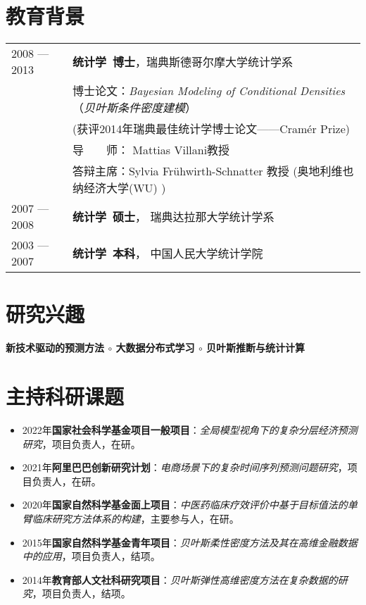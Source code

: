 \documentclass[twoside,a4paper,11pt]{article}
\begin{document}
\section*{教育背景}

\begin{tabular}{ l  p{}}
  2008 --- 2013 & \textbf{统计学~博士}，瑞典斯德哥尔摩大学统计学系 \\
                & 博士论文：\emph{Bayesian Modeling of Conditional Densities}（\emph{贝叶斯条件密度建模}） \\
                & (获评2014年瑞典最佳统计学博士论文——Cramér Prize) \\
                & 导　　师： Mattias Villani教授        \\
                & 答辩主席：Sylvia Frühwirth-Schnatter 教授 (奥地利维也纳经济大学(WU) ) \\
  2007 --- 2008 & \textbf{统计学~硕士}， 瑞典达拉那大学统计学系 \\
  2003 --- 2007 & \textbf{统计学~本科}， 中国人民大学统计学院    \\
\end{tabular}

\section*{研究兴趣}


\textbf{新技术驱动的预测方法 $\circ$  大数据分布式学习 $\circ$ 贝叶斯推断与统计计算}

\section*{主持科研课题}

\begin{itemize}

\item 2022年\textbf{国家社会科学基金项目一般项目}：\emph{全局模型视角下的复杂分层经济预测研究}，项目负责人，在研。

\item 2021年\textbf{阿里巴巴创新研究计划}：\emph{电商场景下的复杂时间序列预测问题研究}，项目负责人，在研。
\item 2020年\textbf{国家自然科学基金面上项目}：\emph{中医药临床疗效评价中基于目标值法的单臂临床研究方法体系的构建}，主要参与人，在研。

\item 2015年\textbf{国家自然科学基金青年项目}：\emph{贝叶斯柔性密度方法及其在高维金融数据中的应用}，项目负责人，结项。

\item 2014年\textbf{教育部人文社科研究项目}：\emph{贝叶斯弹性高维密度方法在复杂数据的研究}，项目负责人，结项。

\end{itemize}
\end{document}
